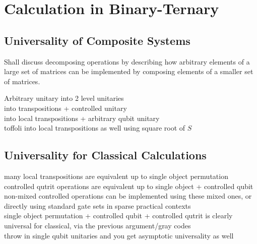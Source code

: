 \chapter[CALCULATION IN BINARY-TERNARY]{Calculation in Binary-Ternary}

\section{Universality of Composite Systems}
Shall discuss decomposing operations by describing how arbitrary elements of a large set of matrices can be implemented by composing elements of a smaller set of matrices.

Arbitrary unitary into 2 level unitaries
\\into transpositions + controlled unitary
\\into local transpositions + arbitrary qubit unitary
\\toffoli into local transpositions as well using square root of $S$
\section{Universality for Classical Calculations}
many local transpositions are equivalent up to single object permutation
\\controlled qutrit operations are equivalent up to single object + controlled qubit
\\non-mixed controlled operations can be implemented using these mixed ones, or directly using standard gate sets in sparse practical contexts
\\single object permutation + controlled qubit + controlled qutrit is clearly universal for classical, via the previous argument/gray codes
\\throw in single qubit unitaries and you get asymptotic universality as well
